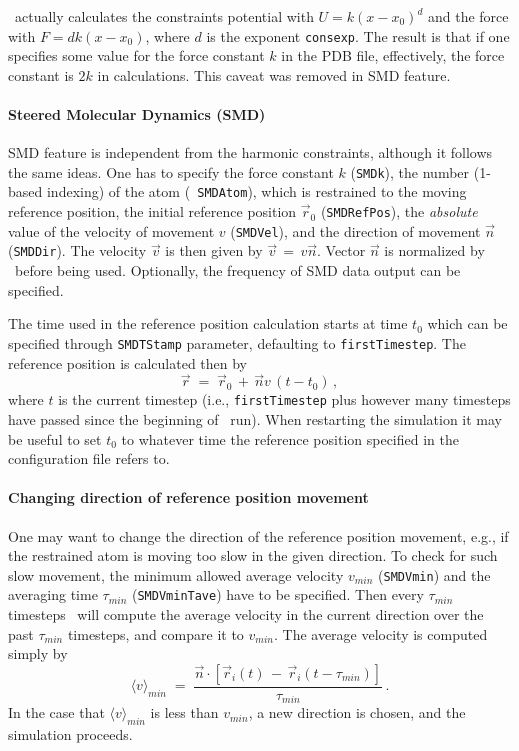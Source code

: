  \NAMD\ actually calculates the constraints
potential with $U = k (x-x_0)^d$ and the force with $F = d k (x-x_0)$,
where $d$ is the exponent {\tt consexp}. The result is that if one
specifies some value for the force constant $k$ in the PDB file,
effectively, the force constant is $2 k$ in calculations. This caveat
was removed in SMD feature.


\paragraph*{Steered Molecular Dynamics (SMD)}

SMD feature is independent from the harmonic constraints, although it
follows the same ideas. One has to specify the force constant $k$
({\tt SMDk}), the number (1-based indexing) of the atom ({\tt
SMDAtom}), which is restrained to the moving reference position, the
initial reference position $\vec r_0$ ({\tt SMDRefPos}), the {\em
absolute} value of the velocity of movement $v$ ({\tt SMDVel}), and
the direction of movement $\vec n$ ({\tt SMDDir}). The velocity $\vec
v$ is then given by $\vec v \, = \, v \vec n$. Vector $\vec n$ is
normalized by \NAMD\ before being used. Optionally, the frequency of
SMD data output can be specified. 

The time used in the reference position calculation starts at time
$t_0$ which can be specified through {\tt SMDTStamp} parameter,
defaulting to {\tt firstTimestep}. The reference position is
calculated then by 
\begin{equation}
  \vec r \; = \; \vec r_0 \, + \, \vec n v \, (t - t_0) \, ,
\end{equation}
where $t$ is the current timestep (i.e., {\tt firstTimestep} plus
however many timesteps have passed since the beginning of \NAMD\ run).
When restarting the simulation it may be useful to set $t_0$ to 
whatever time the reference position specified in the configuration
file refers to.

\paragraph*{Changing direction of reference position movement}

One may want to change the direction of the reference position
movement, e.g., if the restrained atom is moving too slow in the given
direction. To check for such slow movement, the minimum allowed
average velocity $v_{min}$ ({\tt SMDVmin}) and the averaging time
$\tau_{min}$ ({\tt SMDVminTave}) have to be specified. Then every
$\tau_{min}$ timesteps \NAMD\ will compute the average velocity in the
current direction over the past $\tau_{min}$ timesteps, and compare it
to $v_{min}$. The average velocity is computed simply by 
\begin{equation}
   \langle v\rangle_{min} \; = \; \frac{\vec n \cdot [\vec r_i(t) \, - \,
   	\vec r_i(t - \tau_{min}) ]}{\tau_{min}} \, .
\label{eq:smdvmin}
\end{equation}
In the case that $\langle v\rangle_{min}$ is less than $v_{min}$, 
a new direction is chosen, and the simulation proceeds. 

